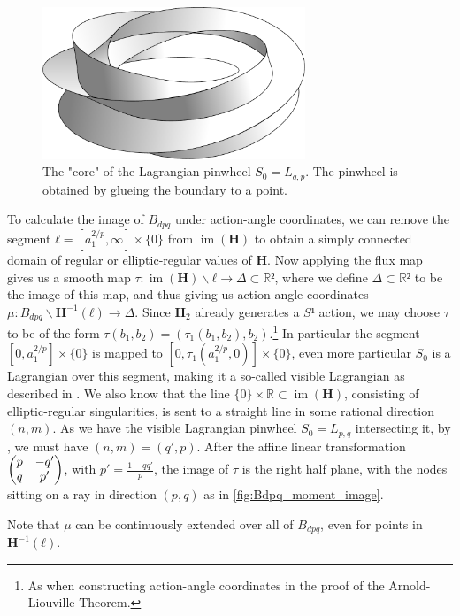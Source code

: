 \documentclass[12pt,a4paper,draft]{scrartcl}
\DeclareMathOperator{\im}{im}
\begin{document}
\begin{figure}
  \centering
  \includegraphics[width=0.7\textwidth]{img/pinwheel2.pdf}
  \caption{The "core" of the Lagrangian pinwheel $S_0 = L_{q,p}$. The pinwheel is obtained by glueing the boundary to a point.}
  \label{fig:pinwheel}
\end{figure}

To calculate the image of $B_{dpq}$ under action-angle coordinates, we can remove the segment $ℓ = [a_1^{2/p},∞] × \{0\}$ from $\im(\symbf{H})$ to obtain a simply connected domain of regular or elliptic-regular values of $\symbf{H}$.
Now applying the flux map gives us a smooth map $τ \colon \im(\symbf{H}) ∖ ℓ → Δ ⊂ ℝ²$, where we define $Δ ⊂ ℝ²$ to be the image of this map, and thus giving us action-angle coordinates $μ \colon B_{dpq} ∖ \symbf{H}^{-1}(ℓ) → Δ$.
Since $\symbf{H}_2$ already generates a $S¹$ action, we may choose $τ$ to be of the form $τ(b_1,b_2) = (τ_1(b_1,b_2), b_2)$.\footnote{As when constructing action-angle coordinates in the proof of the Arnold-Liouville Theorem.}
In particular the segment $[0,a_1^{2/p}] × \{0\}$ is mapped to $[0,τ_1(a_1^{2/p},0)] × \{0\}$, even more particular $S_0$ is a Lagrangian over this segment, making it a so-called visible Lagrangian as described in \cite[Chapter 5]{evans2021atfs}.
We also know that the line $\{0\} × ℝ ⊂ \im(\symbf{H})$, consisting of elliptic-regular singularities, is sent to a straight line in some rational direction $(n,m)$.
As we have the visible Lagrangian pinwheel $S_0 = L_{p,q}$ intersecting it, by \cite[Section 5.3]{evans2021atfs}, we must have $(n,m) = (q',p)$.
After the affine linear transformation $\mqty(p & -q'\\q & p')$, with $p' = \frac{1-qq'}{p}$, the image of $τ$ is the right half plane, with the nodes sitting on a ray in direction $(p,q)$ as in \cref{fig:Bdpq_moment_image}.

Note that $μ$ can be continuously extended over all of $B_{dpq}$, even for points in $\symbf{H}^{-1}(ℓ)$. 
\end{document}
